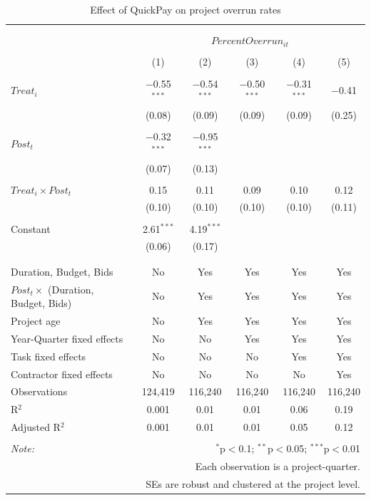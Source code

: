 \documentclass[
]{article}
\begin{document}
\begin{table}[H] \centering 
  \caption{Effect of QuickPay on project overrun rates} 
  \label{} 
\small 
\begin{tabular}{@{\extracolsep{-2pt}}lccccc} 
\\[-1.8ex]\hline 
\hline \\[-1.8ex] 
\\[-1.8ex] & \multicolumn{5}{c}{$PercentOverrun_{it}$} \\ 
\\[-1.8ex] & (1) & (2) & (3) & (4) & (5)\\ 
\hline \\[-1.8ex] 
 $Treat_i$ & $-$0.55$^{***}$ & $-$0.54$^{***}$ & $-$0.50$^{***}$ & $-$0.31$^{***}$ & $-$0.41 \\ 
  & (0.08) & (0.09) & (0.09) & (0.09) & (0.25) \\ 
  & & & & & \\ 
 $Post_t$ & $-$0.32$^{***}$ & $-$0.95$^{***}$ &  &  &  \\ 
  & (0.07) & (0.13) &  &  &  \\ 
  & & & & & \\ 
 $Treat_i \times Post_t$ & 0.15 & 0.11 & 0.09 & 0.10 & 0.12 \\ 
  & (0.10) & (0.10) & (0.10) & (0.10) & (0.11) \\ 
  & & & & & \\ 
 Constant & 2.61$^{***}$ & 4.19$^{***}$ &  &  &  \\ 
  & (0.06) & (0.17) &  &  &  \\ 
  & & & & & \\ 
\hline \\[-1.8ex] 
Duration, Budget, Bids & No & Yes & Yes & Yes & Yes \\ 
$Post_t \times$  (Duration, Budget, Bids) & No & Yes & Yes & Yes & Yes \\ 
Project age & No & Yes & Yes & Yes & Yes \\ 
Year-Quarter fixed effects & No & No & Yes & Yes & Yes \\ 
Task fixed effects & No & No & No & Yes & Yes \\ 
Contractor fixed effects & No & No & No & No & Yes \\ 
Observations & 124,419 & 116,240 & 116,240 & 116,240 & 116,240 \\ 
R$^{2}$ & 0.001 & 0.01 & 0.01 & 0.06 & 0.19 \\ 
Adjusted R$^{2}$ & 0.001 & 0.01 & 0.01 & 0.05 & 0.12 \\ 
\hline 
\hline \\[-1.8ex] 
\textit{Note:}  & \multicolumn{5}{r}{$^{*}$p$<$0.1; $^{**}$p$<$0.05; $^{***}$p$<$0.01} \\ 
 & \multicolumn{5}{r}{Each observation is a project-quarter.} \\ 
 & \multicolumn{5}{r}{SEs are robust and clustered at the project level.} \\ 
\end{tabular} 
\end{table}
\end{document}
